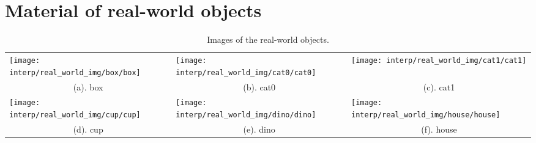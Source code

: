 \section{Material of real-world objects}
\label{sec:real_world_dataset}
\begin{table}[!hbtp]
  \centering
  \begin{tabular}{*{9}{c}}
  \multicolumn{3}{l}{\texttt{[image: interp/real\_world\_img/box/box]}} &
  \multicolumn{3}{l}{\texttt{[image: interp/real\_world\_img/cat0/cat0]}} &
  \multicolumn{3}{l}{\texttt{[image: interp/real\_world\_img/cat1/cat1]}}\\
  \multicolumn{3}{c}{(a). box} & \multicolumn{3}{c}{(b). cat0} & \multicolumn{3}{c}{(c). cat1} \\
  \multicolumn{3}{l}{\texttt{[image: interp/real\_world\_img/cup/cup]}} &
  \multicolumn{3}{l}{\texttt{[image: interp/real\_world\_img/dino/dino]}} &
  \multicolumn{3}{l}{\texttt{[image: interp/real\_world\_img/house/house]}}\\
  \multicolumn{3}{c}{(d). cup} & \multicolumn{3}{c}{(e). dino} & \multicolumn{3}{c}{(f). house} \\
  \end{tabular}
  \caption{Images of the real-world objects.}
  \label{fig:real_data_material}
\end{table}

